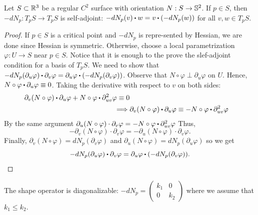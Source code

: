 \begin{lemma}
    Let $S\subset \R^3$ be a regular $C^2$ surface with orientation $N : S \to \S^2$. If $p \in S$, then $-dN_p : T_p S \to T_p S$ is self-adjoint: $-dN_p(v)\bigcdot w = v\bigcdot (-dN_p(w))$ for all $v,w \in T_p S$.
\end{lemma}

\begin{proof}
     \td If $p \in S$ is a critical point and $-dN_p$ is repre-sented by Hessian, we are done since Hessian is symmetric. Otherwise, choose a local parametrization $\varphi : U \to S$ near $p \in S$. Notice that it is enough to the prove the slef-adjoint condition for a basis of $T_pS$. We need to show that $-dN_p(\partial_u \varphi)\bigcdot \partial_v \varphi = \partial_u \varphi \bigcdot (-dN_p(\partial_v \varphi))$. Observe that $N\circ \varphi \perp \partial_u \varphi$ on $U$. Hence, $N \circ \varphi \bigcdot \partial_u \varphi \equiv 0$. Taking the derivative with respect to $v$ on both sides:
    \begin{align*}
         \partial_v(N \circ \varphi)\bigcdot \partial_u \varphi + N\circ \varphi \bigcdot \partial_{uv}^2 \varphi \equiv 0\\
        \implies& \partial_v(N \circ \varphi)\bigcdot \partial_u \varphi \equiv - N\circ \varphi \bigcdot \partial_{uv}^2 \varphi
    \end{align*}
    By the same argument $\partial_u(N \circ \varphi)\cdot \partial_v \varphi = - N\circ \varphi \bigcdot \partial_{uv}^2\varphi$ Thus, 
    $$-\partial_v(N \circ \varphi)\cdot \partial_v \varphi = -\partial_u(N \circ \varphi)\cdot \partial_v \varphi.$$
    Finally, $\partial_v(N\circ \varphi) = dN_p(\partial_v \varphi)$ and $\partial_u(N\circ \varphi) = dN_p(\partial_u \varphi)$ so we get 
    $$-dN_p(\partial_u \varphi)\bigcdot \partial_v \varphi = \partial_u \varphi \bigcdot (-dN_p(\partial_v \varphi)).$$
    \td
\end{proof}

\begin{corollary}
    The shape operator is diagonalizable: $-dN_p = \begin{pmatrix}
        k_1 & 0 \\ 0 & k_2
    \end{pmatrix}$ where we assume that $k_1 \leq k_2$.
\end{corollary}

